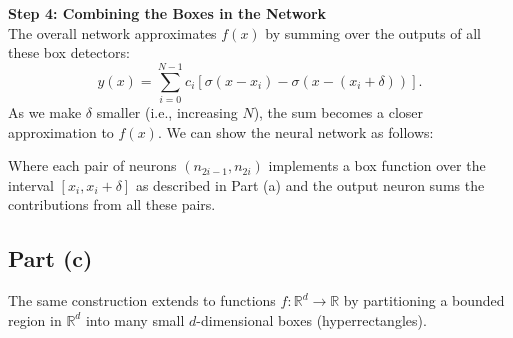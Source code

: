 \documentclass{article}
\begin{document}
\bigskip
\noindent\textbf{Step 4: Combining the Boxes in the Network}\\[0.5em]
The overall network approximates \(f(x)\) by summing over the outputs of all these box detectors:
\[
y(x) = \sum_{i=0}^{N-1} c_i \left[ \sigma(x-x_i) - \sigma(x-(x_i+\delta)) \right].
\]
As we make \(\delta\) smaller (i.e., increasing \(N\)), the sum becomes a closer approximation to \(f(x)\). We can show the neural network as follows:
\bigskip
\begin{center}
    \end{center}
Where each pair of neurons \((n_{2i-1}, n_{2i})\) implements a box function over the interval \([x_i, x_i+\delta]\) as described in Part (a) and the output neuron sums the contributions from all these pairs.
\subsection*{Part (c)}

The same construction extends to functions \( f: \mathbb{R}^d \to \mathbb{R} \) by partitioning a bounded region in \( \mathbb{R}^d \) into many small \(d\)-dimensional boxes (hyperrectangles).
\end{document}
